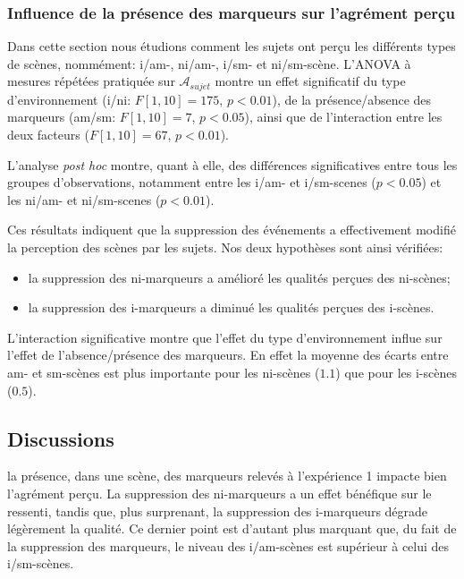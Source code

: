 \documentclass[twoside,twocolumn]{article}
\begin{document}
\subsubsection{Influence de la présence des marqueurs sur l'agrément perçu}


Dans cette section nous étudions comment les sujets ont perçu les différents types de scènes, nommément: i/am-, ni/am-, i/sm- et ni/sm-scène. L'ANOVA à mesures répétées pratiquée sur $\mathcal{A}_{sujet}$ montre un effet significatif du type d'environnement (i/ni: $F[1,10]=175$, $p<0.01$), de la présence/absence des marqueurs (am/sm: $F[1,10]=7$, $p<0.05$), ainsi que de l'interaction entre les deux facteurs ($F[1,10]=67$, $p<0.01$).

L'analyse \emph{post hoc} montre, quant à elle, des différences significatives entre tous les groupes d'observations, notamment entre les i/am- et i/sm-scenes ($p<0.05$) et les ni/am- et ni/sm-scenes ($p<0.01$).

Ces résultats indiquent que la suppression des événements a effectivement modifié la perception des scènes par les sujets. Nos deux hypothèses sont ainsi vérifiées:

\begin{itemize}
\item la suppression des ni-marqueurs a amélioré les qualités perçues des ni-scènes;
\item la suppression des i-marqueurs a diminué les qualités perçues des i-scènes.
\end{itemize}

L'interaction significative montre que l'effet du type d'environnement influe sur l'effet de l'absence/présence des marqueurs. En effet la moyenne des écarts entre am- et sm-scènes est plus importante pour les ni-scènes ($1.1$) que pour les i-scènes ($0.5$). 

\subsection{Discussions}

  la présence, dans une scène, des marqueurs relevés à l'expérience 1 impacte bien l'agrément perçu. La suppression des ni-marqueurs a un effet bénéfique sur le ressenti, tandis que, plus surprenant, la suppression des i-marqueurs dégrade légèrement la qualité. Ce dernier point est d'autant plus marquant que, du fait de la suppression des marqueurs, le niveau des i/am-scènes est supérieur à celui des i/sm-scènes.
\end{document}
